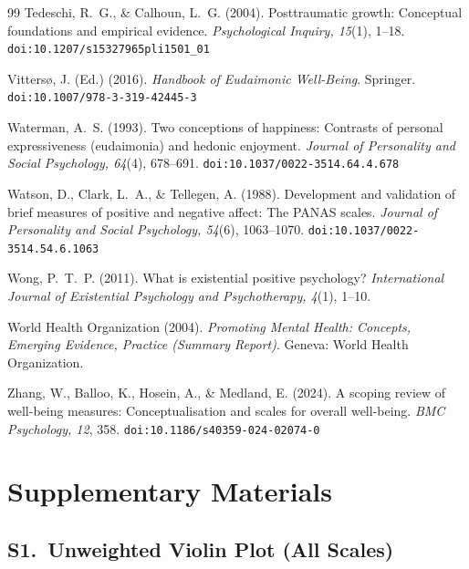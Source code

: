 \documentclass[12pt,a4paper]{article}
\begin{document}
\begin{thebibliography}{99}
Tedeschi, R.~G., \& Calhoun, L.~G. (2004).
Posttraumatic growth: Conceptual foundations and empirical evidence.
\textit{Psychological Inquiry, 15}(1), 1--18.
\texttt{doi:10.1207/s15327965pli1501\_01}

Vittersø, J. (Ed.) (2016).
\textit{Handbook of Eudaimonic Well-Being}.
Springer.
\texttt{doi:10.1007/978-3-319-42445-3}

Waterman, A.~S. (1993).
Two conceptions of happiness: Contrasts of personal expressiveness (eudaimonia) and hedonic enjoyment.
\textit{Journal of Personality and Social Psychology, 64}(4), 678--691.
\texttt{doi:10.1037/0022-3514.64.4.678}

Watson, D., Clark, L.~A., \& Tellegen, A. (1988).
Development and validation of brief measures of positive and negative affect: The PANAS scales.
\textit{Journal of Personality and Social Psychology, 54}(6), 1063--1070.
\texttt{doi:10.1037/0022-3514.54.6.1063}

Wong, P.~T.~P. (2011).
What is existential positive psychology?
\textit{International Journal of Existential Psychology and Psychotherapy, 4}(1), 1--10.

World Health Organization (2004).
\textit{Promoting Mental Health: Concepts, Emerging Evidence, Practice (Summary Report)}.
Geneva: World Health Organization.

Zhang, W., Balloo, K., Hosein, A., \& Medland, E. (2024).
A scoping review of well-being measures: Conceptualisation and scales for overall well-being.
\textit{BMC Psychology, 12}, 358.
\texttt{doi:10.1186/s40359-024-02074-0}

\end{thebibliography}

\newpage
\appendix
\section*{Supplementary Materials}

\subsection*{S1.\ Unweighted Violin Plot (All Scales)}
\end{document}

